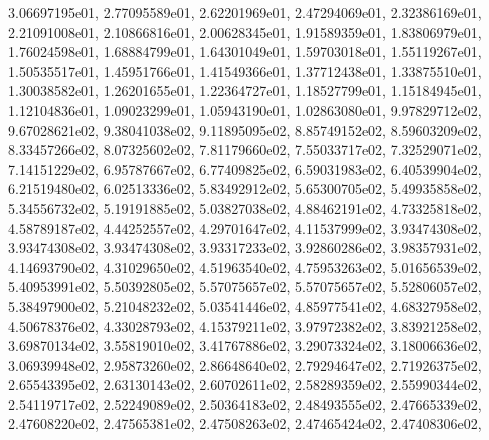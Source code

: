 \documentclass[letterpaper,10pt,english]{sphinxmanual}
\begin{document}
\begin{fulllineitems}
3.06697195e\sphinxhyphen{}01, 2.77095589e\sphinxhyphen{}01, 2.62201969e\sphinxhyphen{}01, 2.47294069e\sphinxhyphen{}01, 2.32386169e\sphinxhyphen{}01, 2.21091008e\sphinxhyphen{}01, 2.10866816e\sphinxhyphen{}01, 2.00628345e\sphinxhyphen{}01, 1.91589359e\sphinxhyphen{}01, 1.83806979e\sphinxhyphen{}01, 1.76024598e\sphinxhyphen{}01, 1.68884799e\sphinxhyphen{}01, 1.64301049e\sphinxhyphen{}01, 1.59703018e\sphinxhyphen{}01, 1.55119267e\sphinxhyphen{}01, 1.50535517e\sphinxhyphen{}01, 1.45951766e\sphinxhyphen{}01, 1.41549366e\sphinxhyphen{}01, 1.37712438e\sphinxhyphen{}01, 1.33875510e\sphinxhyphen{}01, 1.30038582e\sphinxhyphen{}01, 1.26201655e\sphinxhyphen{}01, 1.22364727e\sphinxhyphen{}01, 1.18527799e\sphinxhyphen{}01, 1.15184945e\sphinxhyphen{}01, 1.12104836e\sphinxhyphen{}01, 1.09023299e\sphinxhyphen{}01, 1.05943190e\sphinxhyphen{}01, 1.02863080e\sphinxhyphen{}01, 9.97829712e\sphinxhyphen{}02, 9.67028621e\sphinxhyphen{}02, 9.38041038e\sphinxhyphen{}02, 9.11895095e\sphinxhyphen{}02, 8.85749152e\sphinxhyphen{}02, 8.59603209e\sphinxhyphen{}02, 8.33457266e\sphinxhyphen{}02, 8.07325602e\sphinxhyphen{}02, 7.81179660e\sphinxhyphen{}02, 7.55033717e\sphinxhyphen{}02, 7.32529071e\sphinxhyphen{}02, 7.14151229e\sphinxhyphen{}02, 6.95787667e\sphinxhyphen{}02, 6.77409825e\sphinxhyphen{}02, 6.59031983e\sphinxhyphen{}02, 6.40539904e\sphinxhyphen{}02, 6.21519480e\sphinxhyphen{}02, 6.02513336e\sphinxhyphen{}02, 5.83492912e\sphinxhyphen{}02, 5.65300705e\sphinxhyphen{}02, 5.49935858e\sphinxhyphen{}02, 5.34556732e\sphinxhyphen{}02, 5.19191885e\sphinxhyphen{}02, 5.03827038e\sphinxhyphen{}02, 4.88462191e\sphinxhyphen{}02, 4.73325818e\sphinxhyphen{}02, 4.58789187e\sphinxhyphen{}02, 4.44252557e\sphinxhyphen{}02, 4.29701647e\sphinxhyphen{}02, 4.11537999e\sphinxhyphen{}02, 3.93474308e\sphinxhyphen{}02, 3.93474308e\sphinxhyphen{}02, 3.93474308e\sphinxhyphen{}02, 3.93317233e\sphinxhyphen{}02, 3.92860286e\sphinxhyphen{}02, 3.98357931e\sphinxhyphen{}02, 4.14693790e\sphinxhyphen{}02, 4.31029650e\sphinxhyphen{}02, 4.51963540e\sphinxhyphen{}02, 4.75953263e\sphinxhyphen{}02, 5.01656539e\sphinxhyphen{}02, 5.40953991e\sphinxhyphen{}02, 5.50392805e\sphinxhyphen{}02, 5.57075657e\sphinxhyphen{}02, 5.57075657e\sphinxhyphen{}02, 5.52806057e\sphinxhyphen{}02, 5.38497900e\sphinxhyphen{}02, 5.21048232e\sphinxhyphen{}02, 5.03541446e\sphinxhyphen{}02, 4.85977541e\sphinxhyphen{}02, 4.68327958e\sphinxhyphen{}02, 4.50678376e\sphinxhyphen{}02, 4.33028793e\sphinxhyphen{}02, 4.15379211e\sphinxhyphen{}02, 3.97972382e\sphinxhyphen{}02, 3.83921258e\sphinxhyphen{}02, 3.69870134e\sphinxhyphen{}02, 3.55819010e\sphinxhyphen{}02, 3.41767886e\sphinxhyphen{}02, 3.29073324e\sphinxhyphen{}02, 3.18006636e\sphinxhyphen{}02, 3.06939948e\sphinxhyphen{}02, 2.95873260e\sphinxhyphen{}02, 2.86648640e\sphinxhyphen{}02, 2.79294647e\sphinxhyphen{}02, 2.71926375e\sphinxhyphen{}02, 2.65543395e\sphinxhyphen{}02, 2.63130143e\sphinxhyphen{}02, 2.60702611e\sphinxhyphen{}02, 2.58289359e\sphinxhyphen{}02, 2.55990344e\sphinxhyphen{}02, 2.54119717e\sphinxhyphen{}02, 2.52249089e\sphinxhyphen{}02, 2.50364183e\sphinxhyphen{}02, 2.48493555e\sphinxhyphen{}02, 2.47665339e\sphinxhyphen{}02, 2.47608220e\sphinxhyphen{}02, 2.47565381e\sphinxhyphen{}02, 2.47508263e\sphinxhyphen{}02, 2.47465424e\sphinxhyphen{}02, 2.47408306e\sphinxhyphen{}02, 
\end{fulllineitems}
\end{document}
